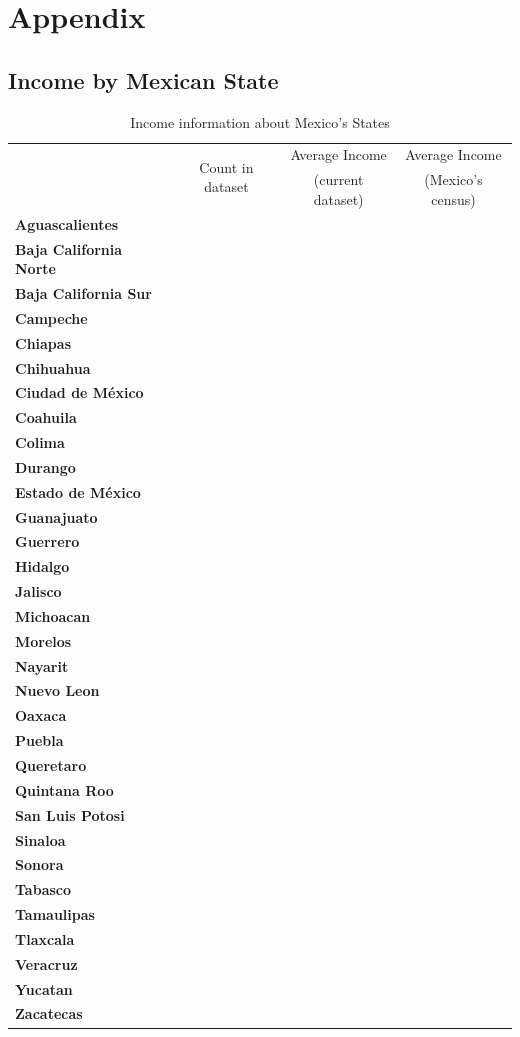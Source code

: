 \appendix
\renewcommand\thefigure{\thesection.\arabic{figure}}
\renewcommand\thetable{\thesection.\arabic{table}}

\setcounter{figure}{0}
\setcounter{table}{0}

\section{Appendix}

\subsection{Income by Mexican State}

\begin{table}[p]
\centering
\begin{tabular}{>{\bfseries}l c c c}
\toprule
\multirow{2}{*}{State} & \multirow{2}{*}{Count in dataset} & Average Income & Average Income \\
& & (current dataset) & (Mexico's census) \\
\midrule
Aguascalientes & & & \\
Baja California Norte & & & \\
Baja California Sur & & & \\
Campeche & & & \\
Chiapas & & & \\
Chihuahua & & & \\
Ciudad de México & & & \\
Coahuila & & & \\
Colima & & & \\
Durango & & & \\
Estado de México & & & \\
Guanajuato & & & \\
Guerrero & & & \\
Hidalgo & & & \\
Jalisco & & & \\
Michoacan & & & \\
Morelos & & & \\
Nayarit & & & \\
Nuevo Leon & & & \\
Oaxaca & & & \\
Puebla & & & \\
Queretaro & & & \\
Quintana Roo & & & \\
San Luis Potosi & & & \\
Sinaloa & & & \\
Sonora & & & \\
Tabasco & & & \\
Tamaulipas & & & \\
Tlaxcala & & & \\
Veracruz & & & \\
Yucatan & & & \\
Zacatecas & & & \\
\bottomrule
\end{tabular}
\caption{Income information about Mexico's States }
\label{tab:regions}
\end{table}

